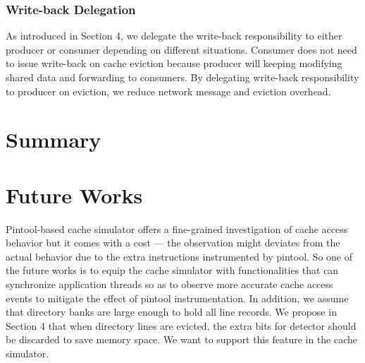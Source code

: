 \documentclass[conference]{IEEEtran}
\begin{document}
\subsubsection{Write-back Delegation}
As introduced in Section 4, we delegate the write-back responsibility to either producer or consumer depending on different situations. Consumer does not need to issue write-back on cache eviction because producer will keeping modifying shared data and forwarding to consumers. By delegating write-back responsibility to producer on eviction, we reduce network message and eviction overhead.



\section{Summary}

\newpage




\section{Future Works}

Pintool-based \cite{pintool} cache simulator offers a fine-grained investigation of cache access behavior but it comes with a cost --- the observation might deviates from the actual behavior due to the extra instructions instrumented by pintool. So one of the future works is to equip the cache simulator with functionalities that can synchronize application threads so as to observe more accurate cache access events to mitigate the effect of pintool instrumentation. In addition, we assume that directory banks are large enough to hold all line records. We propose in Section 4 that when directory lines are evicted, the extra bits for detector should be discarded to save memory space. We want to support this feature in the cache simulator.
\end{document}
